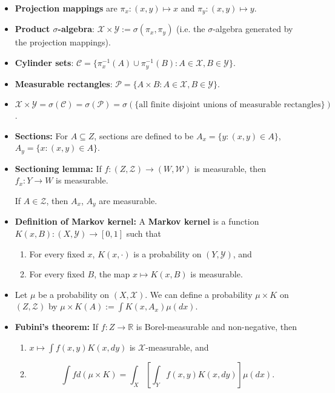\documentclass[twoside]{article}
\newcommand{\dis}{\displaystyle}
\newcommand\bbR{\mathbb{R}}
\newcommand\calC{\mathcal{C}}
\newcommand\calP{\mathcal{P}}
\newcommand\calX{\mathcal{X}}
\newcommand\calY{\mathcal{Y}}
\newcommand\sg{\sigma}
\begin{document}
\begin{itemize}
\item \textbf{Projection mappings} are $\pi_x : (x, y) \mapsto x$ and $\pi_y: (x, y) \mapsto y$.

\item \textbf{Product $\sg$-algebra}: $\calX \times \calY := \sg(\pi_x, \pi_y)$ (i.e. the $\sg$-algebra generated by the projection mappings).

\item \textbf{Cylinder sets}: $\calC = \{ \pi_x^{-1}(A) \cup \pi_y^{-1}(B) : A \in \calX, B \in \calY \}$.

\item \textbf{Measurable rectangles}: $\calP = \{ A \times B: A \in \calX, B \in \calY \}$.

\item $\calX \times \calY = \sg(\calC) = \sg(\calP) = \sg(\{\text{all finite disjoint unions of measurable rectangles} \})$.

\item \textbf{Sections:} For $A \subseteq Z$, sections are defined to be $A_x = \{ y: (x, y) \in A \}$, $A_y = \{ x: (x, y) \in A \}$.

\item \textbf{Sectioning lemma:} If $f: (Z, \mathcal{Z}) \rightarrow (W, \mathcal{W})$ is measurable, then $f_x : Y \rightarrow W$ is measurable. 

If $A \in \mathcal{Z}$, then $A_x$, $A_y$ are measurable.

\item \textbf{Definition of Markov kernel:} A \textbf{Markov kernel} is a function $K(x, B): (X, \mathcal{Y}) \rightarrow [0,1]$ such that
\begin{enumerate}
\item For every fixed $x$, $K(x, \cdot)$ is a probability on $(Y, \mathcal{Y})$, and
\item For every fixed $B$, the map $x \mapsto K(x, B)$ is measurable.
\end{enumerate}

\item Let $\mu$ be a probability on $(X, \mathcal{X})$. We can define a probability $\mu \times K$ on $(Z, \mathcal{Z})$ by $\mu \times K (A) := \dis\int K(x, A_x) \mu(dx)$.

\item \textbf{Fubini's theorem:} If $f: Z \rightarrow \bbR$ is Borel-measurable and non-negative, then 
\begin{enumerate}
\item $x \mapsto \dis\int f(x, y) K(x, dy)$ is $\mathcal{X}$-measurable, and
\item \begin{equation*}\int f d(\mu \times K) = \int_X \left[\int_Y f(x, y) K (x, dy) \right] \mu(dx).\end{equation*}
\end{enumerate}


\end{itemize}
\end{document}
